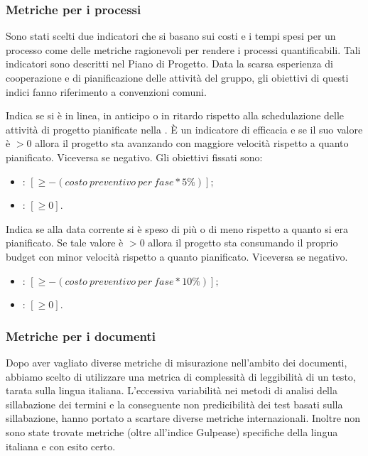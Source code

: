 \subsubsection{Metriche per i processi} %
\label{4.3}
Sono stati scelti due indicatori che si basano sui costi e i tempi spesi per un processo come delle metriche ragionevoli per rendere i processi quantificabili. Tali indicatori sono descritti nel Piano di Progetto. Data la scarsa esperienza di cooperazione e di pianificazione delle attività del gruppo, gli obiettivi di questi indici fanno riferimento a convenzioni comuni.

\label{4.3.1}
Indica se si è in linea, in anticipo o in ritardo rispetto alla schedulazione delle attività di progetto pianificate nella . È un indicatore di efficacia e se il suo valore è $> 0$ allora il progetto sta avanzando con maggiore velocità rispetto a quanto pianificato. Viceversa se negativo.
Gli obiettivi fissati sono:
\begin{itemize}
\item {}: $ [\geq -(costo\:preventivo\:per\:fase * 5\%)]; $
\item {}: $ [\geq 0]. $
\end{itemize}

\label{4.3.2}
Indica se alla data corrente si è speso di più o di meno rispetto a quanto si era pianificato. Se tale valore è $>0$ allora il progetto sta consumando il proprio budget con minor velocità rispetto a quanto pianificato. Viceversa se negativo.
\begin{itemize}
\item {}: $[\geq -(costo\:preventivo\:per\:fase * 10\%)];$
\item {}: $[\geq 0].$
\end{itemize}

\subsubsection{Metriche per i documenti}
\label{4.1}
Dopo aver vagliato diverse metriche di misurazione nell'ambito dei documenti, abbiamo scelto di utilizzare una metrica di complessità di leggibilità di un testo, tarata sulla lingua italiana. L'eccessiva variabilità nei metodi di analisi della sillabazione dei termini e la conseguente non predicibilità dei test basati sulla sillabazione, hanno portato a scartare diverse metriche internazionali. Inoltre non sono state trovate metriche (oltre all'indice Gulpease) specifiche della lingua italiana e con esito certo.


